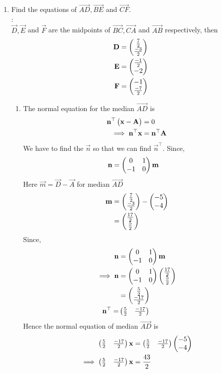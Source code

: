 \documentclass[10pt]{book}
\begin{document}
\begin{enumerate}[label=\thesection.\arabic*.,ref=\thesection.\theenumi]
\item Find the equations of $\vec{AD}, \vec{BE}$ and $\vec{CF}$.\\
 \solution:\\
$\vec{D}, \vec{E}$ and $\vec{F}$ are the midpoints of $\vec{BC}, \vec{CA}$ and $\vec{AB}$ respectively, then\\
\begin{align}
 \mathbf{D} &=  \begin{pmatrix}\frac{7}{2} \\ \frac{-3}{2}\end{pmatrix}\\
 \mathbf{E} &=  \begin{pmatrix}\frac{-1}{2} \\ -2\end{pmatrix}\\
 \mathbf{F} &= \begin{pmatrix}-1 \\ \frac{-7}{2}\end{pmatrix}
\end{align}
\begin{enumerate}

 \item The normal equation for the median $\vec{AD}$ is
  \begin{align}
    \mathbf{n}^{\top}\begin{pmatrix}\mathbf{x}-\mathbf{A}\end{pmatrix}&=0\\
    \implies
    \mathbf{n}^{\top}\mathbf{x}&=\mathbf{n}^{\top}\mathbf{A}
  \end{align}
 We have to find the $\vec{n}$ so that we can find $\vec{n}^{\top}$.
 Since,
\begin{align}
  \mathbf{n} &= \begin{pmatrix}0 & 1\\
  -1 & 0\end{pmatrix}\mathbf{m}
\end{align}
Here $\vec{m} = \vec{D}- \vec{A}$ for median $\vec{AD}$
\begin{align}
\mathbf{m}&=\begin{pmatrix}\frac{7}{2}\\ \frac{-3}{2}\end{pmatrix} - \begin{pmatrix}-5 \\  -4\end{pmatrix}\\
       &=\begin{pmatrix}\frac{17}{2}\\ \frac{5}{2}\end{pmatrix}
\end{align}
Since,
\begin{align}
  \mathbf{n} &= \begin{pmatrix}0 & 1 \\ -1 & 0\end{pmatrix}\mathbf{m} \\
\implies
\mathbf{n} &= \begin{pmatrix}0 & 1 \\ -1 & 0\end{pmatrix} \begin{pmatrix}\frac{17}{2}\\ \frac{5}{2}\end{pmatrix}\\
        &= \begin{pmatrix}\frac{5}{2} \\ \frac{-17}{2}\end{pmatrix} \\
        \mathbf{n}^{\top} = & \begin{pmatrix}\frac{5}{2} & \frac{-17}{2}\end{pmatrix}
\end{align}
Hence the normal equation of median $\vec{AD}$ is 
\begin{align}
    \begin{pmatrix}\frac{5}{2} & \frac{-17}{2}\end{pmatrix}\mathbf{x}&= \begin{pmatrix}\frac{5}{2} & \frac{-17}{2}\end{pmatrix}\begin{pmatrix}-5\\-4\end{pmatrix}\\
    \implies
     \begin{pmatrix}\frac{5}{2} & \frac{-17}{2}\end{pmatrix}\mathbf{x}&= \frac{43}{2}
\end{align}


\end{enumerate}
\end{enumerate}
\end{document}
